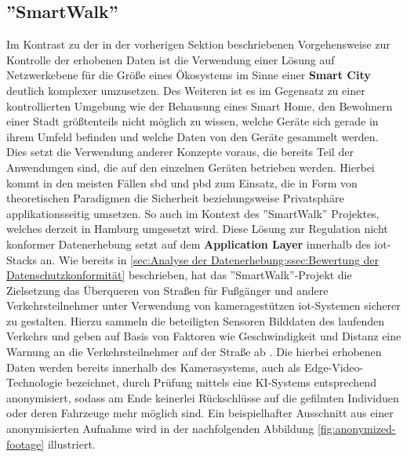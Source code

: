 \subsection{''SmartWalk'' \cite{Natix2022}}
\label{sec:Regulationsmöglichkeiten:ssec:SmartWalk}

Im Kontrast zu der in der vorherigen Sektion  beschriebenen Vorgehensweise zur Kontrolle der erhobenen Daten ist die Verwendung einer Lösung auf Netzwerkebene für die Größe eines Ökosystems im Sinne einer \textbf{Smart City} deutlich komplexer umzusetzen. 
Des Weiteren ist es im Gegensatz zu einer kontrollierten Umgebung wie der Behausung eines Smart Home, den Bewohnern einer Stadt größtenteils nicht möglich zu wissen, welche Geräte sich gerade in ihrem Umfeld befinden und welche Daten von den Geräte gesammelt werden. 
Dies setzt die Verwendung anderer Konzepte voraus, die bereits Teil der Anwendungen sind, die auf den einzelnen Geräten betrieben werden. Hierbei kommt in den meisten Fällen \ac{sbd} und \ac{pbd} zum Einsatz, die in Form von theoretischen Paradigmen die Sicherheit beziehungsweise Privatsphäre applikationsseitig umsetzen. 
So auch im Kontext des ''SmartWalk'' \cite{Natix2022} Projektes, welches derzeit in Hamburg umgesetzt wird. Diese Lösung zur Regulation nicht konformer Datenerhebung setzt auf dem \textbf{Application Layer} innerhalb des \ac{iot}-Stacks an.
Wie bereits in \ref{sec:Analyse der Datenerhebung:ssec:Bewertung der Datenschutzkonformität} beschrieben, hat das ''SmartWalk''-Projekt die Zielsetzung das Überqueren von Straßen für Fußgänger und andere Verkehrsteilnehmer unter Verwendung von kameragestützen \ac{iot}-Systemen sicherer zu gestalten. 
Hierzu sammeln die beteiligten Sensoren Bilddaten des laufenden Verkehrs und geben auf Basis von Faktoren wie Geschwindigkeit und Distanz eine Warnung an die Verkehrsteilnehmer auf der Straße ab \cite{SmartWalk2022}. 
Die hierbei erhobenen Daten werden bereits innerhalb des Kamerasystems, auch als Edge-Video-Technologie bezeichnet, durch Prüfung mittels eine KI-Systems entsprechend anonymisiert, sodass am Ende keinerlei Rückschlüsse auf die gefilmten Individuen oder deren Fahrzeuge mehr möglich sind. Ein beispielhafter Ausschnitt aus einer anonymisierten Aufnahme wird in der nachfolgenden Abbildung \ref{fig:anonymized-footage} illustriert.

